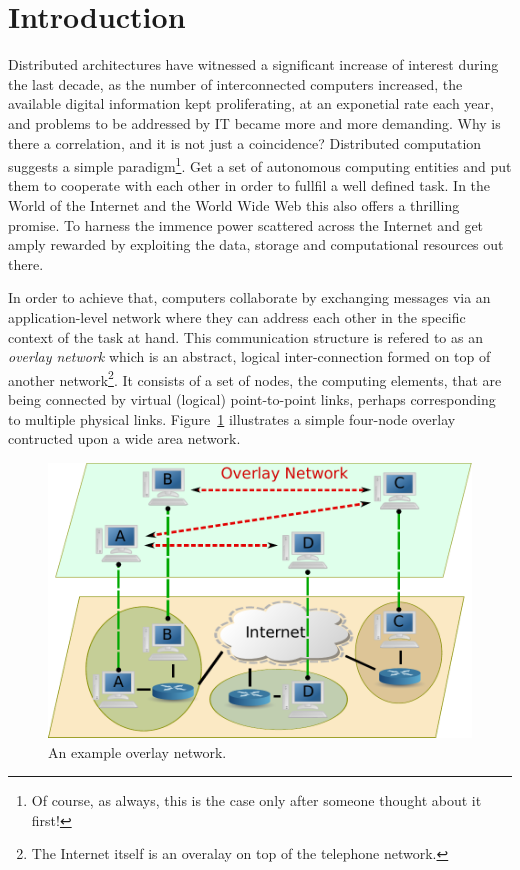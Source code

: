 \section{Introduction}
\label{section:intro}

Distributed architectures have witnessed a significant increase of interest
during the last decade, as the number of interconnected computers increased, the
available digital information kept proliferating, at an exponetial rate each
year, and problems to be addressed by IT became more and more demanding. Why is
there a correlation, and it is not just a coincidence? Distributed computation
suggests a simple paradigm\footnote{Of course, as always, this is the case only
after someone thought about it first!}. Get a set of autonomous computing
entities and put them to cooperate with each other in order to fullfil a well
defined task. In the World of the Internet and the World Wide Web this also
offers a thrilling promise. To harness the immence power scattered across the
Internet and get amply rewarded by exploiting the data, storage and
computational resources out there.

In order to achieve that, computers collaborate by exchanging messages via an
application-level network where they can address each other in the specific
context of the task at hand. This communication structure is refered to as an
\emph{overlay network} which is an abstract, logical inter-connection formed on
top of another network\footnote{The Internet itself is an overalay on top of the
telephone network.}. It consists of a set of nodes, the computing elements, that
are being connected by virtual (logical) point-to-point links, perhaps
corresponding to multiple physical links. Figure~\ref{figure:overlay}
illustrates a simple four-node overlay contructed upon a wide area network.

\begin{figure}
\centering
  \includegraphics[scale=0.5]{img/p2p.pdf}
\caption{An example overlay network.}
\label{figure:overlay}
\end{figure}

